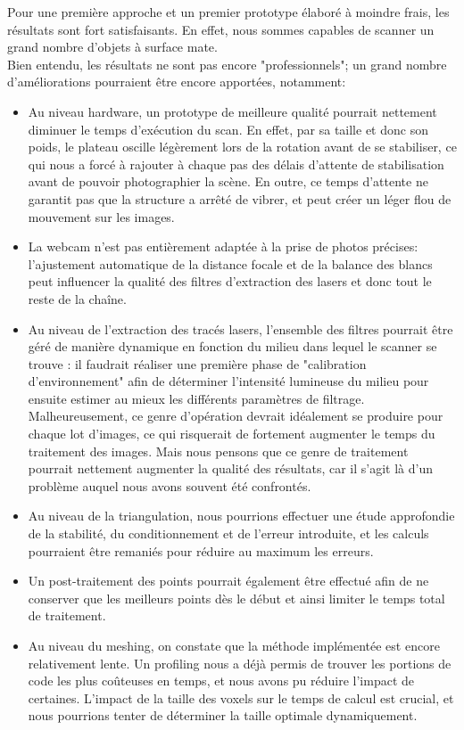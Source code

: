 \documentclass[a4paper,10pt]{report}
\begin{document}
Pour une première approche et un premier prototype élaboré à moindre frais, les résultats sont fort satisfaisants. En effet, nous sommes capables de scanner un grand nombre d'objets à surface mate.\\
Bien entendu, les résultats ne sont pas encore "professionnels"; un grand nombre d'améliorations pourraient être encore apportées, notamment:
\begin{itemize}
\item Au niveau hardware, un prototype de meilleure qualité pourrait nettement diminuer le temps d'exécution du scan. En effet, par sa taille et donc son poids, le plateau oscille légèrement lors de la rotation avant de se stabiliser, ce qui nous a forcé à rajouter à chaque pas des délais d'attente de stabilisation avant de pouvoir photographier la scène. En outre, ce temps d'attente ne garantit pas que la structure a arrêté de vibrer, et peut créer un léger flou de mouvement sur les images.
\item La webcam n'est pas entièrement adaptée à la prise de photos précises: l'ajustement automatique de la distance focale et de la balance des blancs peut influencer la qualité des filtres d'extraction des lasers et donc tout le reste de la chaîne.
\item Au niveau de l'extraction des tracés lasers, l'ensemble des filtres pourrait être géré de manière dynamique en fonction du milieu dans lequel le scanner se trouve : il faudrait réaliser une première phase de "calibration d'environnement" afin de déterminer l'intensité lumineuse du milieu pour ensuite estimer au mieux les différents paramètres de filtrage. Malheureusement, ce genre d'opération devrait idéalement se produire pour chaque lot d'images, ce qui risquerait de fortement augmenter le temps du traitement des images. Mais nous pensons que ce genre de traitement pourrait nettement augmenter la qualité des résultats, car il s'agit là d'un problème auquel nous avons souvent été confrontés.
\item Au niveau de la triangulation, nous pourrions effectuer une étude approfondie de la stabilité, du conditionnement et de l'erreur introduite, et les calculs pourraient être remaniés pour réduire au maximum les erreurs.
\item Un post-traitement des points pourrait également être effectué afin de ne conserver que les meilleurs points dès le début et ainsi limiter le temps total de traitement.
\item Au niveau du meshing, on constate que la méthode implémentée est encore relativement lente. Un profiling nous a déjà permis de trouver les portions de code les plus coûteuses en temps, et nous avons pu réduire l'impact de certaines. L'impact de la taille des voxels sur le temps de calcul est crucial, et nous pourrions tenter de déterminer la taille optimale dynamiquement.
\end{itemize}
\end{document}
